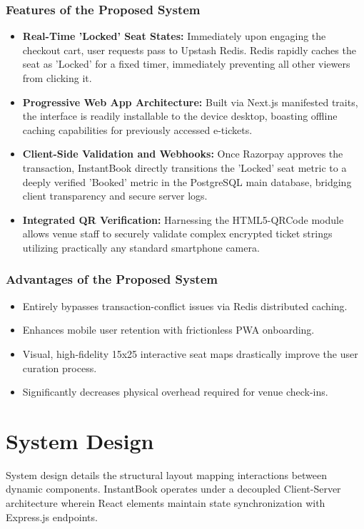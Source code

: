 \documentclass[12pt,a4paper]{report}
\begin{document}
\subsection*{Features of the Proposed System}
\begin{itemize}
    \item \textbf{Real-Time 'Locked' Seat States:} Immediately upon engaging the checkout cart, user requests pass to Upstash Redis. Redis rapidly caches the seat as 'Locked' for a fixed timer, immediately preventing all other viewers from clicking it. 
    \item \textbf{Progressive Web App Architecture:} Built via Next.js manifested traits, the interface is readily installable to the device desktop, boasting offline caching capabilities for previously accessed e-tickets.
    \item \textbf{Client-Side Validation and Webhooks:} Once Razorpay approves the transaction, InstantBook directly transitions the 'Locked' seat metric to a deeply verified 'Booked' metric in the PostgreSQL main database, bridging client transparency and secure server logs.
    \item \textbf{Integrated QR Verification:} Harnessing the HTML5-QRCode module allows venue staff to securely validate complex encrypted ticket strings utilizing practically any standard smartphone camera.
\end{itemize}

\subsection*{Advantages of the Proposed System}
\begin{itemize}
    \item Entirely bypasses transaction-conflict issues via Redis distributed caching.
    \item Enhances mobile user retention with frictionless PWA onboarding.
    \item Visual, high-fidelity 15x25 interactive seat maps drastically improve the user curation process.
    \item Significantly decreases physical overhead required for venue check-ins.
\end{itemize}

\chapter{System Design}

System design details the structural layout mapping interactions between dynamic components. InstantBook operates under a decoupled Client-Server architecture wherein React elements maintain state synchronization with Express.js endpoints.
\end{document}
